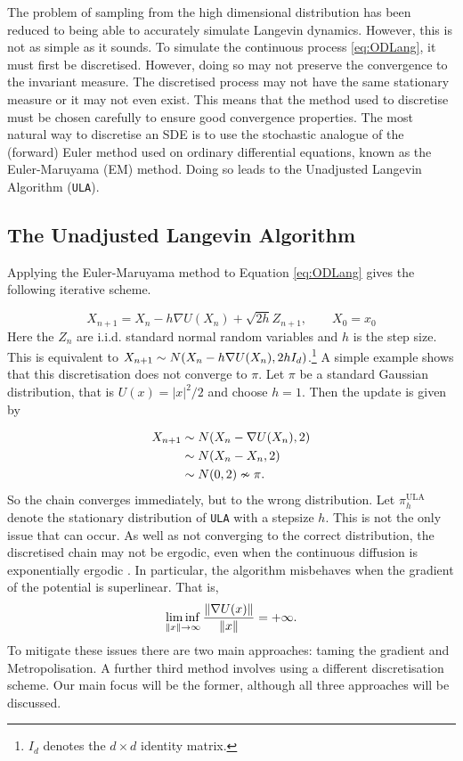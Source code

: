 The problem of sampling from the high dimensional distribution has been reduced to being able to accurately simulate Langevin dynamics. However, this is not as simple as it sounds. To simulate the continuous process  \eqref{eq:ODLang}, it must first be discretised. However, doing so may not preserve the convergence to the invariant measure. The discretised process may not have the same stationary measure or it may not even exist. This means that the method used to discretise must be chosen carefully to ensure good convergence properties. The most natural way to discretise an SDE is to use the stochastic analogue of the (forward) Euler method used on ordinary differential equations, known as the Euler-Maruyama (EM) method. Doing so leads to the Unadjusted Langevin Algorithm (\texttt{ULA}).

\subsection{The Unadjusted Langevin Algorithm}
Applying the Euler-Maruyama method to Equation \eqref{eq:ODLang} gives the following iterative scheme.

\[X_{n+1} = X_n -h \nabla U(X_n) +\sqrt{2h} Z_{n+1},\qquad X_0= x_0 \]
Here the \(Z_n \) are i.i.d. standard normal random variables and \(h\) is the step size. This is equivalent to \(X_{n+1} \sim N(X_n - h\nabla U(X_n), 2h I_d )\).\footnote{\(I_d\) denotes the \(d \times d\) identity matrix.} A simple example shows that this discretisation does not converge to \(\pi\). Let \(\pi\) be a standard Gaussian distribution, that is \(U(x) = |x|^2/2 \) and choose \(h = 1\). Then the update is given by

\begin{align*}
	X_{n+1} &\sim N(X_n - \nabla U(X_n), 2)\\
	& \sim  N(X_n - X_n, 2)\\
	& \sim N(0,2) \nsim \pi .
\end{align*}
So the chain converges immediately, but to the wrong distribution. Let \(\pi^{\text{ULA}}_{h} \) denote the stationary distribution of \texttt{ULA} with a stepsize \(h\). This is not the only issue that can occur. As well as not converging to the correct distribution, the discretised chain may not be  ergodic, even when the continuous diffusion is exponentially ergodic \cite{RT96}. In particular, the algorithm misbehaves when the gradient of the potential is superlinear. That is,
\[\liminf_{\|x\|\to \infty} \frac{\|\nabla U(x)\|}{\|x\|} = +\infty. \]
To mitigate these issues there are two main approaches: taming the gradient and Metropolisation. A further third method involves using a different discretisation scheme.  Our main focus will be the former, although all three approaches will be discussed.

